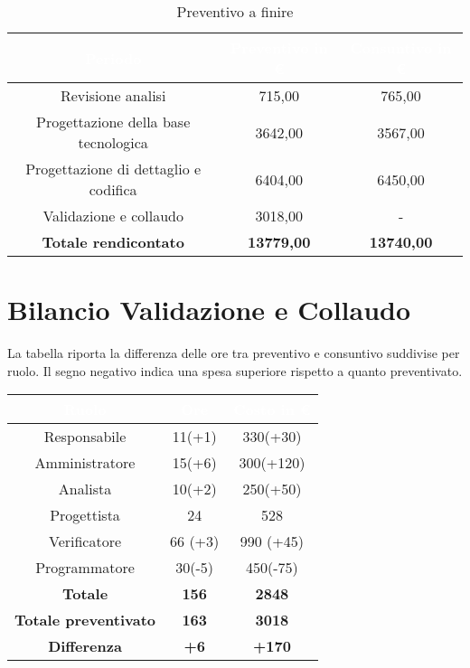 \begin{flushleft}
		\begin{table}[H]
		\begin{center}
			
			
			\begin{tabular}{ccc}
				
				\rowcolor{coolblack}
				\hline
				\textcolor{white}{Periodo} & \textcolor{white}{Preventivo in \euro} & \textcolor{white}{Consuntivo in \euro}\\
				\hline
				Revisione analisi& 715,00 & 765,00 \\ 	
				Progettazione della base tecnologica& 3642,00 & 3567,00\\ 
				Progettazione di dettaglio e codifica& 6404,00   & 6450,00\\ 
				Validazione e collaudo & 3018,00 & - \\ \hline
				\textbf{Totale rendicontato}& \textbf{13779,00} & \textbf{13740,00}	\\ \hline   
				
			\end{tabular}
			\caption{Preventivo a finire} 
		\end{center}		
	\end{table}
\newpage

	\section{Bilancio Validazione e Collaudo}\label{BilVC}
La tabella riporta la differenza delle ore tra preventivo e consuntivo suddivise per ruolo. Il segno negativo indica una spesa superiore rispetto a quanto preventivato.\\
		\begin{table}[H]
		\begin{center}
			\begin{tabular}{ccc}
				\rowcolor{coolblack}
				\hline
				\textcolor{white}{Ruolo} & \textcolor{white}{Ore} & \textcolor{white}{Costo in \euro}\\
				\hline
				Responsabile   & 11(+1)	&  	330(+30)	\\ 
				Amministratore & 15(+6)	&  	300(+120)	\\ 
				Analista       & 10(+2) &   250(+50)\\ 
				Progettista    & 24 &   528   \\ 
				Verificatore   & 66	(+3)&  	990 (+45) 	\\ 
				Programmatore  & 30(-5)&   	450(-75)\\ \hline
				\textbf{Totale}& \textbf{156} & \textbf{2848}	\\ \hline 
				\textbf{Totale preventivato}& \textbf{163} & \textbf{3018}\\ \hline 
				\textbf{Differenza}& \textbf{+6} & \textbf{+170}	\\ \hline  
			\end{tabular}
			

\end{center}
\end{table}
\end{flushleft}
